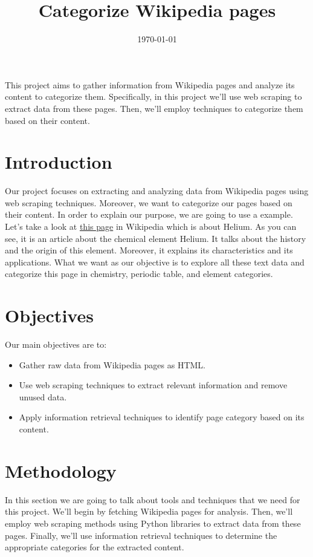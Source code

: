 \documentclass{article}
\title{Categorize Wikipedia pages}
\date{\today}
\renewenvironment{abstract}{%
    \small
    \begin{flushleft}%
        \textbf{\abstractname}%
        \vspace{-\baselineskip}%
        \vspace{0.25\baselineskip}%
    \end{flushleft}%
    \list{}{%
        \setlength{\leftmargin}{0.25cm}%
        \setlength{\rightmargin}{\leftmargin}%
    }%
    \item\relax
}{%
    \endlist
}
\begin{document}
\maketitle

\begin{abstract}
This project aims to gather information from Wikipedia pages and analyze its content to categorize them.
Specifically, in this project we'll use web scraping to extract data from these pages. Then, we'll employ techniques to categorize them based on their content.
\end{abstract}

\section{Introduction}
Our project focuses on extracting and analyzing data from Wikipedia pages using web scraping techniques. Moreover, we want
to categorize our pages based on their content. In order to explain our purpose, we are going to use a example.
Let's take a look at \href{https://en.wikipedia.org/wiki/Helium}{this page} in Wikipedia which is about Helium.
As you can see, it is an article about the chemical element Helium. It talks about the history and the origin of this element. Moreover, it explains its characteristics
and its applications. What we want as our objective is to explore all these text data and categorize this page in chemistry, periodic table, and element categories.

\section{Objectives}
Our main objectives are to:
\begin{itemize}
    \item Gather raw data from Wikipedia pages as HTML.
    \item Use web scraping techniques to extract relevant information and remove unused data.
    \item Apply information retrieval techniques to identify page category based on its content.
\end{itemize}

\section{Methodology}
In this section we are going to talk about tools and techniques that we need for this project.
We'll begin by fetching Wikipedia pages for analysis.
Then, we'll employ web scraping methods using Python libraries to extract data from these pages.
Finally, we'll use information retrieval techniques to determine the appropriate categories for the extracted content.
\end{document}
